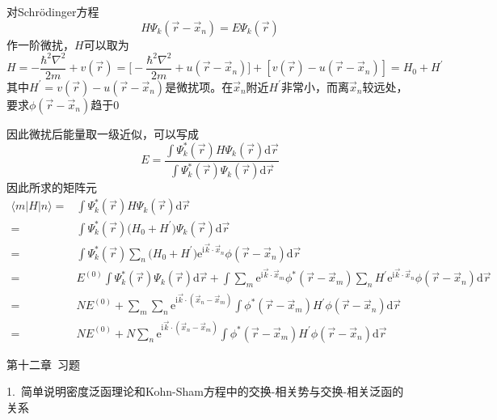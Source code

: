 对\textrm{Schr\"odinger}方程
\begin{displaymath}
	H\Psi_k(\vec r-\vec x_n)=E\Psi_k(\vec r)
\end{displaymath}
作一阶微扰，$H$可以取为
\begin{displaymath}
	H=-\dfrac{\hbar^2\nabla^2}{2m}+v(\vec r)=\bigg[-\dfrac{\hbar^2\nabla^2}{2m}+u(\vec r-\vec x_n)\bigg]+[v(\vec r)-u(\vec r-\vec x_n)]=H_0+H^{\prime}
\end{displaymath}
其中$H^{\prime}=v(\vec r)-u(\vec r-\vec x_n)$是微扰项。在$\vec x_n$附近$H^{\prime}$非常小，而离$\vec x_n$较远处，要求$\phi(\vec r-\vec x_n)$趋于0

因此微扰后能量取一级近似，可以写成
\begin{displaymath}
	E=\dfrac{\int\Psi_k^{\ast}(\vec r)H\Psi_k(\vec r)\mathrm{d}\vec r}{\int\Psi_k^{\ast}(\vec r)\Psi_k(\vec r)\mathrm{d}\vec r}
\end{displaymath}
因此所求的矩阵元
\begin{displaymath}
	\begin{aligned}
		\langle m|H|n\rangle=&\int\Psi_k^{\ast}(\vec r)H\Psi_k(\vec r)\mathrm{d}\vec r\\
		=&\int\Psi_k^{\ast}(\vec r)\big(H_0+H^{\prime}\big)\Psi_k(\vec r)\mathrm{d}\vec r\\
		=&\int\Psi_k^{\ast}(\vec r)\sum_n\big(H_0+H^{\prime}\big)\mathrm{e}^{\mathrm{i}\vec k\cdot\vec x_n}\phi(\vec r-\vec x_n)\mathrm{d}\vec r\\
		=&E^{(0)}\int\Psi_k^{\ast}(\vec r)\Psi_k(\vec r)\mathrm{d}\vec r+\int\sum_m\mathrm{e}^{\mathrm{i}\vec k\cdot\vec x_m}\phi^{\ast}(\vec r-\vec x_m)\sum_nH^{\prime}\mathrm{e}^{\mathrm{i}\vec k\cdot\vec x_n}\phi(\vec r-\vec x_n)\mathrm{d}\vec r\\
		=&NE^{(0)}+\sum_m\sum_n\mathrm{e}^{\mathrm{i}\vec k\cdot(\vec x_n-\vec x_m)}\int\phi^{\ast}(\vec r-\vec x_m)H^{\prime}\phi(\vec r-\vec x_n)\mathrm{d}\vec r\\
		=&NE^{(0)}+N\sum_n\mathrm{e}^{\mathrm{i}\vec k\cdot(\vec x_n-\vec x_m)}\int\phi^{\ast}(\vec r-\vec x_m)H^{\prime}\phi(\vec r-\vec x_n)\mathrm{d}\vec r
	\end{aligned}
\end{displaymath}



{\heiti 第十二章~习题}

1.~简单说明密度泛函理论和\textrm{Kohn-Sham}方程中的交换-相关势与交换-相关泛函的关系

